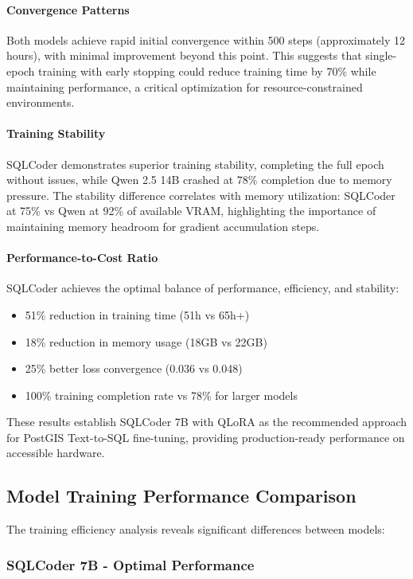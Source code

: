 \paragraph{Convergence Patterns}
Both models achieve rapid initial convergence within 500 steps (approximately 12 hours), with minimal improvement beyond this point. This suggests that single-epoch training with early stopping could reduce training time by 70\% while maintaining performance, a critical optimization for resource-constrained environments.

\paragraph{Training Stability}
SQLCoder demonstrates superior training stability, completing the full epoch without issues, while Qwen 2.5 14B crashed at 78\% completion due to memory pressure. The stability difference correlates with memory utilization: SQLCoder at 75\% vs Qwen at 92\% of available VRAM, highlighting the importance of maintaining memory headroom for gradient accumulation steps.

\paragraph{Performance-to-Cost Ratio}
SQLCoder achieves the optimal balance of performance, efficiency, and stability:
\begin{itemize}[leftmargin=1.2em]
  \item 51\% reduction in training time (51h vs 65h+)
  \item 18\% reduction in memory usage (18GB vs 22GB)
  \item 25\% better loss convergence (0.036 vs 0.048)
  \item 100\% training completion rate vs 78\% for larger models
\end{itemize}

These results establish SQLCoder 7B with QLoRA as the recommended approach for PostGIS Text-to-SQL fine-tuning, providing production-ready performance on accessible hardware.

\subsection{Model Training Performance Comparison}

The training efficiency analysis reveals significant differences between models:

\subsubsection{SQLCoder 7B - Optimal Performance}

